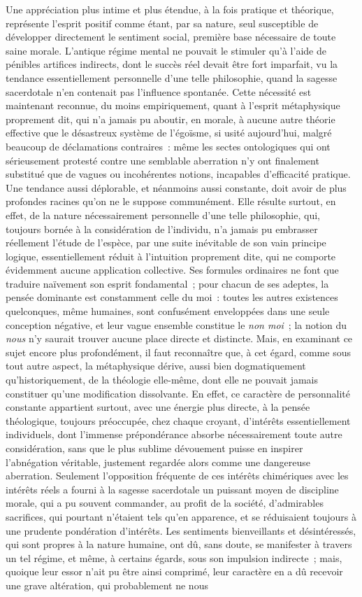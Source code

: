 \documentclass[french,twoside]{book} %
\begin{document}
Une appréciation plus intime et plus étendue, à la fois pratique et théorique, représente l’esprit positif comme étant, par sa nature, seul susceptible de développer directement le sentiment social, première base nécessaire de toute saine morale. L’antique régime mental ne pouvait le stimuler qu’à l’aide de pénibles artifices indirects, dont le succès réel devait être fort imparfait, vu la tendance essentiellement personnelle d’une telle philosophie, quand la sagesse sacerdotale n’en contenait pas l’influence spontanée. Cette nécessité est maintenant reconnue, du moins empiriquement, quant à l’esprit métaphysique proprement dit, qui n’a jamais pu aboutir, en morale, à aucune autre théorie effective que le désastreux système de l’égoïsme, si usité aujourd’hui, malgré beaucoup de déclamations contraires : même les sectes ontologiques qui ont sérieusement protesté contre une semblable aberration n’y ont finalement substitué que de vagues ou incohérentes notions, incapables d’efficacité pratique. Une tendance aussi déplorable, et néanmoins aussi constante, doit avoir de plus profondes racines qu’on ne le suppose communément. Elle résulte surtout, en effet, de la nature nécessairement personnelle d’une telle philosophie, qui, toujours bornée à la considération de l’individu, n’a jamais pu embrasser réellement l’étude de l’espèce, par une suite inévitable de son vain principe logique, essentiellement réduit à l’intuition proprement dite, qui ne comporte évidemment aucune application collective. Ses formules ordinaires ne font que traduire naïvement son esprit fondamental ; pour chacun de ses adeptes, la pensée dominante est constamment celle du moi : toutes les autres existences quelconques, même humaines, sont confusément enveloppées dans une seule conception négative, et leur vague ensemble constitue le {\itshape non moi} ; la notion du {\itshape nous} n’y saurait trouver aucune place directe et distincte. Mais, en examinant ce sujet encore plus profondément, il faut reconnaître que, à cet égard, comme sous tout autre aspect, la métaphysique dérive, aussi bien dogmatiquement qu’historiquement, de la théologie elle-même, dont elle ne pouvait jamais constituer qu’une modification dissolvante. En effet, ce caractère de personnalité constante appartient surtout, avec une énergie plus directe, à la pensée théologique, toujours préoccupée, chez chaque croyant, d’intérêts essentiellement individuels, dont l’immense prépondérance absorbe nécessairement toute autre considération, sans que le plus sublime dévouement puisse en inspirer l’abnégation véritable, justement regardée alors comme une dangereuse aberration. Seulement l’opposition fréquente de ces intérêts chimériques avec les intérêts réels a fourni à la sagesse sacerdotale un puissant moyen de discipline morale, qui a pu souvent commander, au profit de la société, d’admirables sacrifices, qui pourtant n’étaient tels qu’en apparence, et se réduisaient toujours à une prudente pondération d’intérêts. Les sentiments bienveillants et désintéressés, qui sont propres à la nature humaine, ont dû, sans doute, se manifester à travers un tel régime, et même, à certains égards, sous son impulsion indirecte ; mais, quoique leur essor n’ait pu être ainsi comprimé, leur caractère en a dû recevoir une grave altération, qui probablement ne nous 
\end{document}

